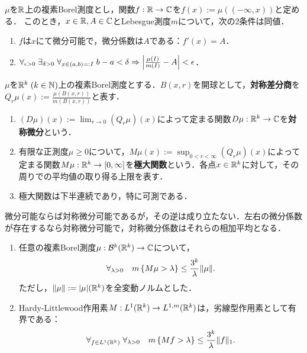 \documentclass[uplatex,dvipdfmx]{jsreport}
\begin{document}
\begin{theorem}[測度の分布関数の微分可能性]
    $\mu$を$\mathbb{R}$上の複素Borel測度とし，関数$f:\mathbb{R}\to\mathbb{C}$を$f(x):=\mu((-\infty,x))$と定める．
    このとき，$x\in\mathbb{R},A\in\mathbb{C}$とLebesgue測度$m$について，次の2条件は同値．
    \begin{enumerate}
        \item $f$は$x$にて微分可能で，微分係数は$A$である：$f'(x)=A$．
        \item $\forall_{\epsilon>0}\;\exists_{\delta>0}\;\forall_{x\in(a,b)=:I}\;b-a<\delta\Rightarrow\left|\frac{\mu(I)}{m(I)}-A\right|<\epsilon$．
    \end{enumerate}
\end{theorem}

\begin{definition}
    $\mu$を$\mathbb{R}^k\;(k\in\mathbb{N})$上の複素Borel測度とする．$B(x,r)$を開球として，\textbf{対称差分商}を
    $Q_r\mu(x):=\frac{\mu(B(x,r))}{m(B(x,r))}$と表す．
    \begin{enumerate}
        \item $(D\mu)(x):=\lim_{r\to0}(Q_r\mu)(x)$によって定まる関数$D\mu:\mathbb{R}^k\to\mathbb{C}$を\textbf{対称微分}という．
        \item 有限な正測度$\mu\ge0$について，$M\mu(x):=\sup_{0<r<\infty}(Q_r\mu)(x)$によって定まる関数$M\mu:\mathbb{R}^k\to[0,\infty]$を\textbf{極大関数}という．各点$x\in\mathbb{R}^k$に対して，その周りでの平均値の取り得る上限を表す．
        \item 極大関数は下半連続であり，特に可測である．
    \end{enumerate}
\end{definition}
\begin{remark}
    微分可能ならば対称微分可能であるが，その逆は成り立たない．左右の微分係数が存在するなら対称微分可能で，対称微分係数はそれらの相加平均となる．
\end{remark}

\begin{theorem}\mbox{}
    \begin{enumerate}
        \item 任意の複素Borel測度$\mu:\mathcal{B}^k(\mathbb{R}^k)\to\mathbb{C}$について，
        \[\forall_{\lambda>0}\quad m\left\{M\mu>\lambda\right\}\le \frac{3^k}{\lambda}\|\mu\|.\]ただし，$\|\mu\|:=\lvert\mu\rvert(\mathbb{R}^k)$を全変動ノルムとした．
        \item Hardy-Littlewood作用素$M:L^1(\mathbb{R}^k)\to L^{1,m}(\mathbb{R}^k)$は，劣線型作用素として有界である：
        \[\forall_{f\in L^1(\mathbb{R}^k)}\;\forall_{\lambda>0}\quad m\left\{Mf>\lambda\right\}\le\frac{3^k}{\lambda}\|f\|_1.\]
    \end{enumerate}
\end{theorem}
\end{document}
